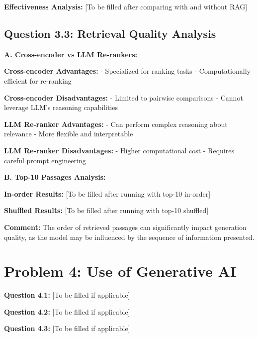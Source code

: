 \documentclass[11pt]{article}
\begin{document}
\textbf{Effectiveness Analysis:} [To be filled after comparing with and without RAG]

\subsection{Question 3.3: Retrieval Quality Analysis}

\textbf{A. Cross-encoder vs LLM Re-rankers:}

\textbf{Cross-encoder Advantages:}
- Specialized for ranking tasks
- Computationally efficient for re-ranking

\textbf{Cross-encoder Disadvantages:}
- Limited to pairwise comparisons
- Cannot leverage LLM's reasoning capabilities

\textbf{LLM Re-ranker Advantages:}
- Can perform complex reasoning about relevance
- More flexible and interpretable

\textbf{LLM Re-ranker Disadvantages:}
- Higher computational cost
- Requires careful prompt engineering

\textbf{B. Top-10 Passages Analysis:}

\textbf{In-order Results:} [To be filled after running with top-10 in-order]

\textbf{Shuffled Results:} [To be filled after running with top-10 shuffled]

\textbf{Comment:} The order of retrieved passages can significantly impact generation quality, as the model may be influenced by the sequence of information presented.

\section{Problem 4: Use of Generative AI}

\textbf{Question 4.1:} [To be filled if applicable]

\textbf{Question 4.2:} [To be filled if applicable]

\textbf{Question 4.3:} [To be filled if applicable]
\end{document}
